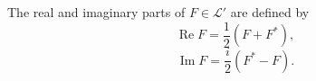 The real and imaginary parts of $F \in \mathcal{L}'$ are defined by
$$\operatorname{Re} F = \frac{1}{2}(F + F^*),$$
$$\operatorname{Im} F = \frac{i}{2}(F^* - F).$$
